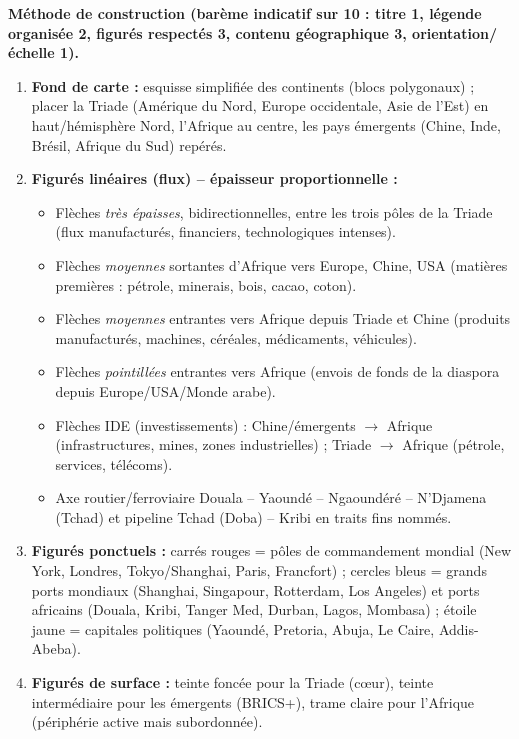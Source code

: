 \documentclass[11pt]{article}
\begin{document}
\begin{corrige}
\textbf{Méthode de construction (barème indicatif sur 10 : titre 1, légende organisée 2, figurés respectés 3, contenu géographique 3, orientation/échelle 1).}
\begin{enumerate}
    \item \textbf{Fond de carte :} esquisse simplifiée des continents (blocs polygonaux) ; placer la Triade (Amérique du Nord, Europe occidentale, Asie de l'Est) en haut/hémisphère Nord, l'Afrique au centre, les pays émergents (Chine, Inde, Brésil, Afrique du Sud) repérés.
    \item \textbf{Figurés linéaires (flux) -- épaisseur proportionnelle :}
    \begin{itemize}
        \item Flèches \emph{très épaisses}, bidirectionnelles, entre les trois pôles de la Triade (flux manufacturés, financiers, technologiques intenses).
        \item Flèches \emph{moyennes} sortantes d'Afrique vers Europe, Chine, USA (matières premières : pétrole, minerais, bois, cacao, coton).
        \item Flèches \emph{moyennes} entrantes vers Afrique depuis Triade et Chine (produits manufacturés, machines, céréales, médicaments, véhicules).
        \item Flèches \emph{pointillées} entrantes vers Afrique (envois de fonds de la diaspora depuis Europe/USA/Monde arabe).
        \item Flèches IDE (investissements) : Chine/émergents $\rightarrow$ Afrique (infrastructures, mines, zones industrielles) ; Triade $\rightarrow$ Afrique (pétrole, services, télécoms).
        \item Axe routier/ferroviaire Douala -- Yaoundé -- Ngaoundéré -- N'Djamena (Tchad) et pipeline Tchad (Doba) -- Kribi en traits fins nommés.
    \end{itemize}
    \item \textbf{Figurés ponctuels :} carrés rouges = pôles de commandement mondial (New York, Londres, Tokyo/Shanghai, Paris, Francfort) ; cercles bleus = grands ports mondiaux (Shanghai, Singapour, Rotterdam, Los Angeles) et ports africains (Douala, Kribi, Tanger Med, Durban, Lagos, Mombasa) ; étoile jaune = capitales politiques (Yaoundé, Pretoria, Abuja, Le Caire, Addis-Abeba).
    \item \textbf{Figurés de surface :} teinte foncée pour la Triade (cœur), teinte intermédiaire pour les émergents (BRICS+), trame claire pour l'Afrique (périphérie active mais subordonnée).

\end{enumerate}
\end{corrige}
\end{document}
